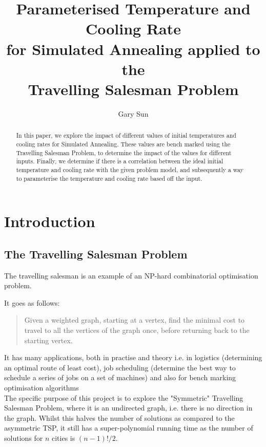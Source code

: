 \documentclass{article}
\title{
    Parameterised Temperature and Cooling Rate \\
    \large for Simulated Annealing applied to the \\
    Travelling Salesman Problem
}
\author{Gary Sun}
\date{}
\begin{document}
\maketitle

\begin{abstract}
    In this paper, we explore the impact of different values of initial temperatures and cooling rates for Simulated Annealing.
    These values are bench marked using the Travelling Salesman Problem, to determine the impact of the values for different inputs. 
    Finally, we determine if there is a correlation between the ideal initial temperature and cooling rate with the given problem model, and subsequently a way to parameterise the temperature and cooling rate based off the input.
\end{abstract}

\tableofcontents

\newpage
\section{Introduction}
\subsection{The Travelling Salesman Problem}
The travelling salesman is an example of an NP-hard combinatorial optimisation problem.

It goes as follows:
\begin{quote}
Given a weighted graph, starting at a vertex, find the minimal cost to travel to all the vertices of the graph once, before returning back to the starting vertex.
\end{quote}

It has many applications, both in practise and theory i.e. in logistics (determining an optimal route of least cost), job scheduling (determine the best way to schedule a series of jobs on a set of machines) and also for bench marking optimisation algorithms
\\

The specific purpose of this project is to explore the "Symmetric" Travelling Salesman Problem, where it is an undirected graph, i.e. there is no direction in the graph.
Whilst this halves the number of solutions as compared to the asymmetric TSP, it still has a super-polynomial running time as the number of solutions for $n$ cities is $(n - 1)! / 2$.
\end{document}
